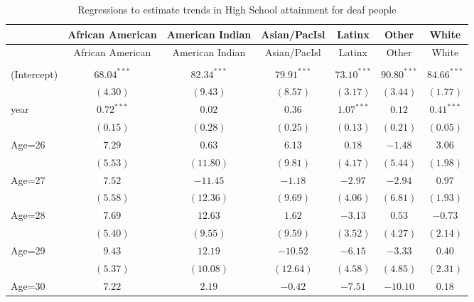 \documentclass[fullpage]{paper}
\begin{document}
\begin{center}
\begin{longtable}{l c c c c c c }
\hline
 & African American & American Indian & Asian/PacIsl & Latinx & Other & White \\
\hline
\endfirsthead
\hline
 & African American & American Indian & Asian/PacIsl & Latinx & Other & White \\
\hline
\endhead
\hline
\endfoot
\hline
\multicolumn{7}{l}{\scriptsize{$^{***}p<0.001$, $^{**}p<0.01$, $^*p<0.05$}}\\
\caption{Regressions to estimate trends in High School attainment for deaf people}
\label{table:coefficients}
\endlastfoot
(Intercept) & $68.04^{***}$ & $82.34^{***}$ & $79.91^{***}$ & $73.10^{***}$  & $90.80^{***}$  & $84.66^{***}$ \\
            & $(4.30)$      & $(9.43)$      & $(8.57)$      & $(3.17)$       & $(3.44)$       & $(1.77)$      \\
year        & $0.72^{***}$  & $0.02$        & $0.36$        & $1.07^{***}$   & $0.12$         & $0.41^{***}$  \\
            & $(0.15)$      & $(0.28)$      & $(0.25)$      & $(0.13)$       & $(0.21)$       & $(0.05)$      \\
Age=26      & $7.29$        & $0.63$        & $6.13$        & $0.18$         & $-1.48$        & $3.06$        \\
            & $(5.53)$      & $(11.80)$     & $(9.81)$      & $(4.17)$       & $(5.44)$       & $(1.98)$      \\
Age=27      & $7.52$        & $-11.45$      & $-1.18$       & $-2.97$        & $-2.94$        & $0.97$        \\
            & $(5.58)$      & $(12.36)$     & $(9.69)$      & $(4.06)$       & $(6.81)$       & $(1.93)$      \\
Age=28      & $7.69$        & $12.63$       & $1.62$        & $-3.13$        & $0.53$         & $-0.73$       \\
            & $(5.40)$      & $(9.55)$      & $(9.59)$      & $(3.52)$       & $(4.27)$       & $(2.14)$      \\
Age=29      & $9.43$        & $12.19$       & $-10.52$      & $-6.15$        & $-3.33$        & $0.40$        \\
            & $(5.37)$      & $(10.08)$     & $(12.64)$     & $(4.58)$       & $(4.85)$       & $(2.31)$      \\
Age=30      & $7.22$        & $2.19$        & $-0.42$       & $-7.51$        & $-10.10$       & $0.18$        \\

\end{longtable}
\end{center}
\end{document}

